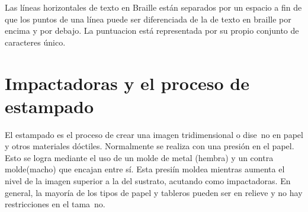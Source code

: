 
Las l\'ineas horizontales de texto en Braille est\'an separados por un espacio
a fin de que los puntos de una l\'inea puede ser diferenciada de la de texto
en braille por encima y por debajo. La puntuacion est\'a representada por su
propio conjunto de caracteres \'unico.

\section{Impactadoras y el proceso de estampado} 
El estampado es el proceso de crear una imagen tridimensional o dise~no en
papel y otros materiales d\'octiles. Normalmente se realiza con una presi\'on
en el papel. 
Esto se logra mediante el uso de un molde de metal (hembra) y un contra
molde(macho) que encajan entre s\'i. Esta presi\'in moldea mientras aumenta el
nivel de la imagen superior a la del sustrato, acutando como impactadoras.
En general, la mayor\'ia de los tipos de papel y tableros pueden ser en relieve
y no hay restricciones en el tama~no.

%
%
% 
